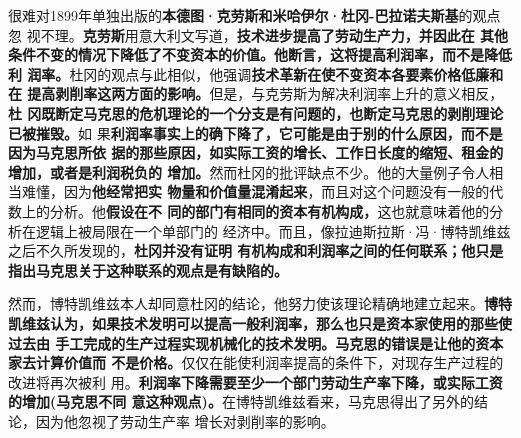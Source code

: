 很难对1899年单独出版的\textbf{本德图·克劳斯和米哈伊尔·杜冈-巴拉诺夫斯基}的观点忽
视不理。\textbf{克劳斯}用意大利文写道，\textbf{技术进步提高了劳动生产力，并因此在
  其他条件不变的情况下降低了不变资本的价值。他断言，这将提高利润率，而不是降低利
  润率。}杜冈的观点与此相似，他强调\textbf{技术革新在使不变资本各要素价格低廉和在
  提高剥削率这两方面的影响。}但是，与克劳斯为解决利润率上升的意义相反，\textbf{杜
  冈既断定马克思的危机理论的一个分支是有问题的，也断定马克思的剥削理论已被摧毁。}如
果\textbf{利润率事实上的确下降了，它可能是由于别的什么原因，而不是因为马克思所依
  据的那些原因，如实际工资的增长、工作日长度的缩短、租金的增加，或者是利润税负的
  增加。}然而杜冈的批评缺点不少。他的大量例子令人相当难懂，因为\textbf{他经常把实
  物量和价值量混淆起来}，而且对这个问题没有一般的代数上的分析。他\textbf{假设在不
  同的部门有相同的资本有机构成，}这也就意味着他的分析在逻辑上被局限在一个单部门的
经济中。而且，像拉迪斯拉斯·冯·博特凯维兹之后不久所发现的，\textbf{杜冈并没有证明
  有机构成和利润率之间的任何联系；他只是指出马克思关于这种联系的观点是有缺陷的。}

然而，博特凯维兹本人却同意杜冈的结论，他努力使该理论精确地建立起来。\textbf{博特
  凯维兹认为，如果技术发明可以提高一般利润率，那么也只是资本家使用的那些使过去由
  手工完成的生产过程实现机械化的技术发明。马克思的错误是让他的资本家去计算价值而
  不是价格。}仅仅在能使利润率提高的条件下，对现存生产过程的改进将再次被利
用。\textbf{利润率下降需要至少一个部门劳动生产率下降，或实际工资的增加(马克思不同
  意这种观点)。}在博特凯维兹看来，马克思得出了另外的结论，因为他忽视了劳动生产率
增长对剥削率的影响。

